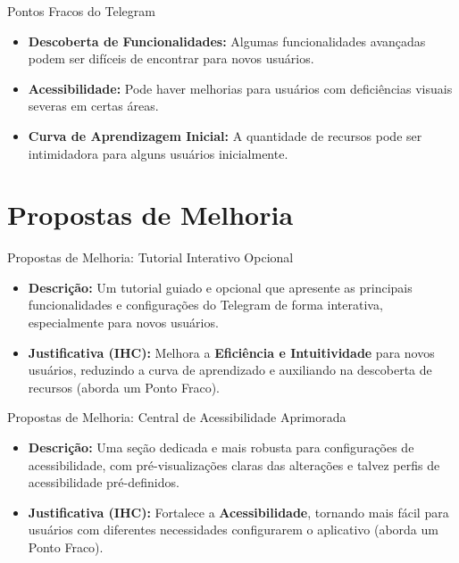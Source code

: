 \documentclass[aspectratio=169,xcolor=table]{beamer}
\begin{document}
\begin{frame}{Pontos Fracos do Telegram}
    \begin{itemize}
        \item \textbf{Descoberta de Funcionalidades:} Algumas funcionalidades avançadas podem ser difíceis de encontrar para novos usuários.
        \item \textbf{Acessibilidade:} Pode haver melhorias para usuários com deficiências visuais severas em certas áreas.
        \item \textbf{Curva de Aprendizagem Inicial:} A quantidade de recursos pode ser intimidadora para alguns usuários inicialmente.
    \end{itemize}
\end{frame}

\section{Propostas de Melhoria}
\begin{frame}{Propostas de Melhoria: Tutorial Interativo Opcional}
    \begin{itemize}
        \item \textbf{Descrição:} Um tutorial guiado e opcional que apresente as principais funcionalidades e configurações do Telegram de forma interativa, especialmente para novos usuários.
        \item \textbf{Justificativa (IHC):} Melhora a \textbf{Eficiência e Intuitividade} para novos usuários, reduzindo a curva de aprendizado e auxiliando na descoberta de recursos (aborda um Ponto Fraco).
    \end{itemize}
\end{frame}

\begin{frame}{Propostas de Melhoria: Central de Acessibilidade Aprimorada}
    \begin{itemize}
        \item \textbf{Descrição:} Uma seção dedicada e mais robusta para configurações de acessibilidade, com pré-visualizações claras das alterações e talvez perfis de acessibilidade pré-definidos.
        \item \textbf{Justificativa (IHC):} Fortalece a \textbf{Acessibilidade}, tornando mais fácil para usuários com diferentes necessidades configurarem o aplicativo (aborda um Ponto Fraco).
    \end{itemize}
\end{frame}
\end{document}
